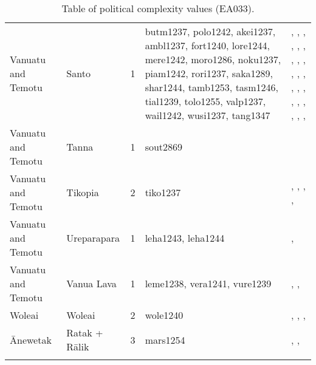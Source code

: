 \begin{longtable}{p{3cm}p{3cm}p{2cm}p{2cm}p{4cm}}
  Vanuatu and Temotu & Santo & 1 & butm1237, polo1242, akei1237, ambl1237, fort1240, lore1244, mere1242, moro1286, noku1237, piam1242, rori1237, saka1289, shar1244, tamb1253, tasm1246, tial1239, tolo1255, valp1237, wail1242, wusi1237, tang1347 & \citet{bonnemaison1996power}, \citet{bonnemaison1996power}, \citet{bonnemaison1996power}, \citet{bonnemaison1996power}, \citet{bonnemaison1996power}, \citet{bonnemaison1996power}, \citet{bonnemaison1996power}, \citet{bonnemaison1996power}, \citet{bonnemaison1996power}, \citet{bonnemaison1996power}, \citet{bonnemaison1996power}, \citet{bonnemaison1996power}, \citet{bonnemaison1996power}, \citet{bonnemaison1996power}, \citet{bonnemaison1996power}, \citet{bonnemaison1996power}, \citet{bonnemaison1996power}, \citet{bonnemaison1996power}, \citet{bonnemaison1996power}, \citet{bonnemaison1996power}, \citet{bonnemaison1996power}, \citet{bonnemaison1996power} \\ 
  Vanuatu and Temotu & Tanna & 1 & sout2869 & \citet{lindstroem1991} \\ 
  Vanuatu and Temotu & Tikopia & 2 & tiko1237 & \citet{kirch1994wet}, \citet{sahlins1958social}, \citet{firth1939primitive}, \citet{firth1959social}, \citet{firth1991} \\ 
  Vanuatu and Temotu & Ureparapara & 1 & leha1243, leha1244 & \citet{bonnemaison1996power}, \citet{bonnemaison1996power} \\ 
  Vanuatu and Temotu & Vanua Lava & 1 & leme1238, vera1241, vure1239 & \citet{bonnemaison1996power}, \citet{bonnemaison1996power}, \citet{bonnemaison1996power} \\ 
  Woleai & Woleai & 2 & wole1240 & \citet{alkire1991woleai}, \citet{alkire1991woleai}, \citet{burrowsandspiro1953}, \citet{burrowsandspiro1953} \\ 
  Ānewetak & Ratak + Rālik & 3 & mars1254 & \citet{carruci1991marshall}, \citet{erdland1914}, \citet{williamson_1982} \\ 
   \bottomrule
\caption{Table of political complexity values (EA033).} 
\label{appendix_pol_complex_xtable}
\end{longtable}
